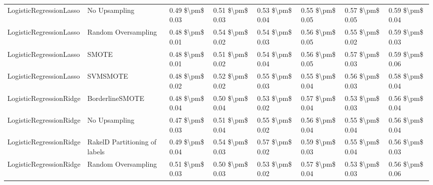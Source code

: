 \begin{tabular}{llllllll}
        LogisticRegressionLasso &                 No Upsampling & 0.49 \$\textbackslash pm\$ 0.03 &           0.51 \$\textbackslash pm\$ 0.03 &       0.53 \$\textbackslash pm\$ 0.04 &        0.55 \$\textbackslash pm\$ 0.05 &                         0.57 \$\textbackslash pm\$ 0.05 &     0.59 \$\textbackslash pm\$ 0.04 \\
        LogisticRegressionLasso &           Random Oversampling & 0.48 \$\textbackslash pm\$ 0.01 &           0.54 \$\textbackslash pm\$ 0.02 &       0.54 \$\textbackslash pm\$ 0.03 &        0.56 \$\textbackslash pm\$ 0.05 &                         0.55 \$\textbackslash pm\$ 0.02 &     0.59 \$\textbackslash pm\$ 0.03 \\
        LogisticRegressionLasso &                         SMOTE & 0.48 \$\textbackslash pm\$ 0.01 &           0.51 \$\textbackslash pm\$ 0.02 &       0.54 \$\textbackslash pm\$ 0.04 &        0.56 \$\textbackslash pm\$ 0.05 &                         0.57 \$\textbackslash pm\$ 0.03 &     0.59 \$\textbackslash pm\$ 0.06 \\
        LogisticRegressionLasso &                      SVMSMOTE & 0.48 \$\textbackslash pm\$ 0.02 &           0.52 \$\textbackslash pm\$ 0.02 &       0.55 \$\textbackslash pm\$ 0.03 &        0.55 \$\textbackslash pm\$ 0.04 &                         0.56 \$\textbackslash pm\$ 0.03 &     0.58 \$\textbackslash pm\$ 0.04 \\
        LogisticRegressionRidge &               BorderlineSMOTE & 0.48 \$\textbackslash pm\$ 0.04 &           0.50 \$\textbackslash pm\$ 0.04 &       0.53 \$\textbackslash pm\$ 0.02 &        0.57 \$\textbackslash pm\$ 0.04 &                         0.53 \$\textbackslash pm\$ 0.03 &     0.56 \$\textbackslash pm\$ 0.04 \\
        LogisticRegressionRidge &                 No Upsampling & 0.47 \$\textbackslash pm\$ 0.03 &           0.51 \$\textbackslash pm\$ 0.04 &       0.55 \$\textbackslash pm\$ 0.02 &        0.56 \$\textbackslash pm\$ 0.04 &                         0.55 \$\textbackslash pm\$ 0.04 &     0.56 \$\textbackslash pm\$ 0.04 \\
        LogisticRegressionRidge & RakelD Partitioning of labels & 0.49 \$\textbackslash pm\$ 0.04 &           0.54 \$\textbackslash pm\$ 0.03 &       0.57 \$\textbackslash pm\$ 0.02 &        0.59 \$\textbackslash pm\$ 0.03 &                         0.55 \$\textbackslash pm\$ 0.04 &     0.56 \$\textbackslash pm\$ 0.03 \\
        LogisticRegressionRidge &           Random Oversampling & 0.51 \$\textbackslash pm\$ 0.03 &           0.50 \$\textbackslash pm\$ 0.03 &       0.53 \$\textbackslash pm\$ 0.02 &        0.57 \$\textbackslash pm\$ 0.04 &                         0.53 \$\textbackslash pm\$ 0.03 &     0.56 \$\textbackslash pm\$ 0.06 \\

\end{tabular}

